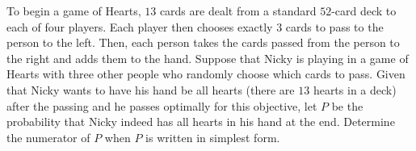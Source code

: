 To begin a game of Hearts, $13$ cards are dealt from a standard $52$-card deck to each of four players. Each player then chooses exactly $3$ cards to pass to the person to the left. Then, each person takes the cards passed from the person to the right and adds them to the hand. Suppose that Nicky is playing in a game of Hearts with three other people who randomly choose which cards to pass. Given that Nicky wants to have his hand be all hearts (there are $13$ hearts in a deck) after the passing and he passes optimally for this objective, let $P$ be the probability that Nicky indeed has all hearts in his hand at the end. Determine the numerator of $P$ when $P$ is written in simplest form.